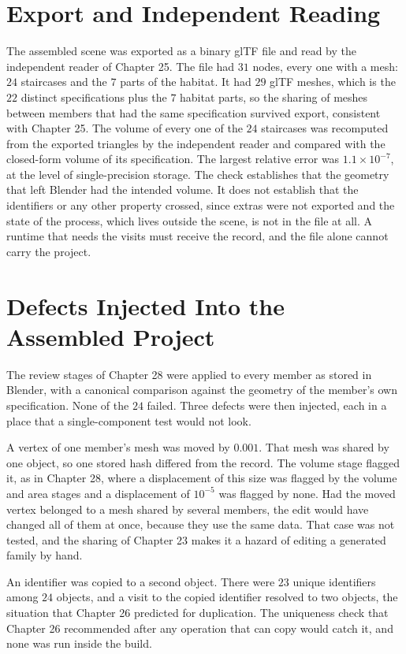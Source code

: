 \section{Export and Independent Reading}

The assembled scene was exported as a binary glTF file and read by the independent reader of Chapter 25. The file had $31$ nodes, every one with a mesh: $24$ staircases and the $7$ parts of the habitat. It had $29$ glTF meshes, which is the $22$ distinct specifications plus the $7$ habitat parts, so the sharing of meshes between members that had the same specification survived export, consistent with Chapter 25. The volume of every one of the $24$ staircases was recomputed from the exported triangles by the independent reader and compared with the closed-form volume of its specification. The largest relative error was $1.1\times 10^{-7}$, at the level of single-precision storage. The check establishes that the geometry that left Blender had the intended volume. It does not establish that the identifiers or any other property crossed, since extras were not exported and the state of the process, which lives outside the scene, is not in the file at all. A runtime that needs the visits must receive the record, and the file alone cannot carry the project.

\section{Defects Injected Into the Assembled Project}

The review stages of Chapter 28 were applied to every member as stored in Blender, with a canonical comparison against the geometry of the member's own specification. None of the $24$ failed. Three defects were then injected, each in a place that a single-component test would not look.

A vertex of one member's mesh was moved by $0.001$. That mesh was shared by one object, so one stored hash differed from the record. The volume stage flagged it, as in Chapter 28, where a displacement of this size was flagged by the volume and area stages and a displacement of $10^{-5}$ was flagged by none. Had the moved vertex belonged to a mesh shared by several members, the edit would have changed all of them at once, because they use the same data. That case was not tested, and the sharing of Chapter 23 makes it a hazard of editing a generated family by hand.

An identifier was copied to a second object. There were $23$ unique identifiers among $24$ objects, and a visit to the copied identifier resolved to two objects, the situation that Chapter 26 predicted for duplication. The uniqueness check that Chapter 26 recommended after any operation that can copy would catch it, and none was run inside the build.

